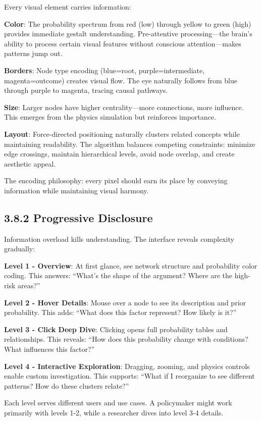\documentclass[
  11pt,
  letterpaper,
]{book}
\begin{document}
Every visual element carries information:

\textbf{Color}: The probability spectrum from red (low) through yellow
to green (high) provides immediate gestalt understanding. Pre-attentive
processing---the brain's ability to process certain visual features
without conscious attention---makes patterns jump out.

\textbf{Borders}: Node type encoding (blue=root, purple=intermediate,
magenta=outcome) creates visual flow. The eye naturally follows from
blue through purple to magenta, tracing causal pathways.

\textbf{Size}: Larger nodes have higher centrality---more connections,
more influence. This emerges from the physics simulation but reinforces
importance.

\textbf{Layout}: Force-directed positioning naturally clusters related
concepts while maintaining readability. The algorithm balances competing
constraints: minimize edge crossings, maintain hierarchical levels,
avoid node overlap, and create aesthetic appeal.

The encoding philosophy: every pixel should earn its place by conveying
information while maintaining visual harmony.

\subsection{3.8.2 Progressive
Disclosure}\label{sec-progressive-disclosure}

Information overload kills understanding. The interface reveals
complexity gradually:

\textbf{Level 1 - Overview}: At first glance, see network structure and
probability color coding. This answers: ``What's the shape of the
argument? Where are the high-risk areas?''

\textbf{Level 2 - Hover Details}: Mouse over a node to see its
description and prior probability. This adds: ``What does this factor
represent? How likely is it?''

\textbf{Level 3 - Click Deep Dive}: Clicking opens full probability
tables and relationships. This reveals: ``How does this probability
change with conditions? What influences this factor?''

\textbf{Level 4 - Interactive Exploration}: Dragging, zooming, and
physics controls enable custom investigation. This supports: ``What if I
reorganize to see different patterns? How do these clusters relate?''

Each level serves different users and use cases. A policymaker might
work primarily with levels 1-2, while a researcher dives into level 3-4
details.
\end{document}
